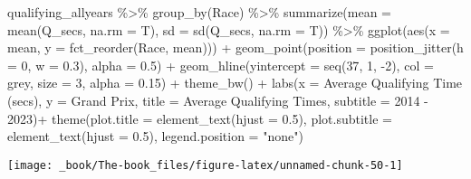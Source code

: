 \documentclass[
]{book}
\newenvironment{Shaded}{\begin{snugshade}}{\end{snugshade}}
\newcommand{\AttributeTok}[1]{\textcolor[rgb]{0.77,0.63,0.00}{#1}}
\newcommand{\DecValTok}[1]{\textcolor[rgb]{0.00,0.00,0.81}{#1}}
\newcommand{\FloatTok}[1]{\textcolor[rgb]{0.00,0.00,0.81}{#1}}
\newcommand{\FunctionTok}[1]{\textcolor[rgb]{0.00,0.00,0.00}{#1}}
\newcommand{\NormalTok}[1]{#1}
\newcommand{\SpecialCharTok}[1]{\textcolor[rgb]{0.00,0.00,0.00}{#1}}
\newcommand{\StringTok}[1]{\textcolor[rgb]{0.31,0.60,0.02}{#1}}
\begin{document}
\begin{Shaded}
\begin{Highlighting}[]
\NormalTok{qualifying\_allyears }\SpecialCharTok{\%\textgreater{}\%}
  \FunctionTok{group\_by}\NormalTok{(Race) }\SpecialCharTok{\%\textgreater{}\%}
  \FunctionTok{summarize}\NormalTok{(}\AttributeTok{mean =} \FunctionTok{mean}\NormalTok{(Q\_secs, }\AttributeTok{na.rm =}\NormalTok{ T),}
            \AttributeTok{sd =} \FunctionTok{sd}\NormalTok{(Q\_secs, }\AttributeTok{na.rm =}\NormalTok{ T)) }\SpecialCharTok{\%\textgreater{}\%} 
  \FunctionTok{ggplot}\NormalTok{(}\FunctionTok{aes}\NormalTok{(}\AttributeTok{x =}\NormalTok{ mean, }\AttributeTok{y =} \FunctionTok{fct\_reorder}\NormalTok{(Race, mean))) }\SpecialCharTok{+}
  \FunctionTok{geom\_point}\NormalTok{(}\AttributeTok{position =} \FunctionTok{position\_jitter}\NormalTok{(}\AttributeTok{h =} \DecValTok{0}\NormalTok{, }\AttributeTok{w =} \FloatTok{0.3}\NormalTok{), }\AttributeTok{alpha =} \FloatTok{0.5}\NormalTok{) }\SpecialCharTok{+}
  \FunctionTok{geom\_hline}\NormalTok{(}\AttributeTok{yintercept =} \FunctionTok{seq}\NormalTok{(}\DecValTok{37}\NormalTok{, }\DecValTok{1}\NormalTok{, }\SpecialCharTok{{-}}\DecValTok{2}\NormalTok{), }\AttributeTok{col =} \StringTok{\textquotesingle{}grey\textquotesingle{}}\NormalTok{, }\AttributeTok{size =} \DecValTok{3}\NormalTok{, }\AttributeTok{alpha =} \FloatTok{0.15}\NormalTok{) }\SpecialCharTok{+}
  \FunctionTok{theme\_bw}\NormalTok{() }\SpecialCharTok{+}
  \FunctionTok{labs}\NormalTok{(}\AttributeTok{x =} \StringTok{\textquotesingle{}Average Qualifying Time (secs)\textquotesingle{}}\NormalTok{,}
       \AttributeTok{y =} \StringTok{\textquotesingle{}Grand Prix\textquotesingle{}}\NormalTok{,}
       \AttributeTok{title =} \StringTok{\textquotesingle{}Average Qualifying Times\textquotesingle{}}\NormalTok{,}
       \AttributeTok{subtitle =} \StringTok{\textquotesingle{}2014 {-} 2023\textquotesingle{}}\NormalTok{)}\SpecialCharTok{+}
  \FunctionTok{theme}\NormalTok{(}\AttributeTok{plot.title =} \FunctionTok{element\_text}\NormalTok{(}\AttributeTok{hjust =} \FloatTok{0.5}\NormalTok{),}
        \AttributeTok{plot.subtitle =} \FunctionTok{element\_text}\NormalTok{(}\AttributeTok{hjust =} \FloatTok{0.5}\NormalTok{),}
        \AttributeTok{legend.position =} \StringTok{"none"}\NormalTok{)}
\end{Highlighting}
\end{Shaded}

\begin{center}\texttt{[image: \_book/The-book\_files/figure-latex/unnamed-chunk-50-1]} \end{center}
\end{document}
